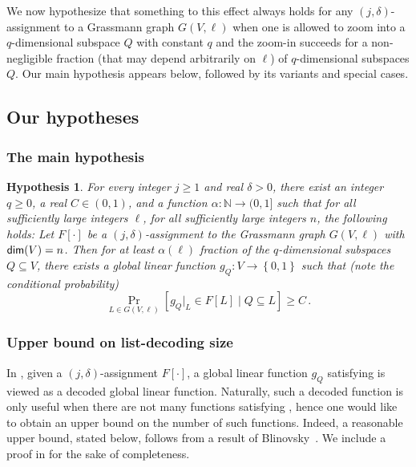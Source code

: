 \documentclass{toc}
\newtheorem{conj}[theorem]{Hypothesis}
\newcommand\set[1]{{\left\{ #1 \right\}}}
\newcommand\Prob[2]{{\Pr_{#1}\left[ {#2} \right]}}
\newcommand*\aconj[1]{\alpha{#1}}
\begin{document}
%
%
%
%
We now hypothesize that something to this effect always holds for any $(j,\delta)$-assignment to a Grassmann graph $G(V,\ell)$
when one is allowed to zoom into a $q$-dimensional subspace $Q$ with constant $q$ and the zoom-in succeeds for a non-negligible
fraction (that may depend arbitrarily on $\ell$)
of $q$-dimensional subspaces $Q$. Our main hypothesis appears below, followed by its variants and special cases.

\subsection{Our hypotheses}

%
\subsubsection{The main hypothesis}

\begin{conj}\label{conj:main2}
For every integer $j \geqslant 1$ and %
real  %
$\delta>0$, there exist an integer $q \geqslant 0$, %
a real  %
$C \in (0,1)$,
  and a function $\aconj\colon\mathbb{N}\to (0,1]$ such that
  for all sufficiently large integers $\ell$, for all sufficiently large integers $n$,
  the following holds:
  Let $F[\cdot]$ be a $(j,\delta)$-assignment to the Grassmann graph $G(V,\ell)$ with ${\sf dim}(V) = n$.
  Then for at least $\aconj{(\ell)}$ fraction of the $q$-dimensional subspaces $Q \subseteq V$,
  there exists a global linear function $g_Q: V \to \set{0,1}$ such that (note the conditional probability)
  \begin{equation} \label{eqn:global-fn} 
  \Prob{L \in G(V, \ell)}{g_Q|_L \in F[L] \mid Q \subseteq L}\geqslant C\,.%
  \end{equation}
\end{conj}


%
\subsubsection{Upper bound on list-decoding size}
In , given a $(j,\delta)$-assignment $F[\cdot]$,
a global linear function $g_Q$ satisfying
 is viewed as a decoded
%
global linear function.
Naturally, such a decoded function is only useful when there are not many functions satisfying
, hence one would like to obtain an upper bound on the number of such
functions.
%
%
%
Indeed, a reasonable upper bound, stated below, follows from
%
a result    %
of Blinovsky~\cite{Bli1}.
We include a proof in  for the sake of completeness.
\end{document}
